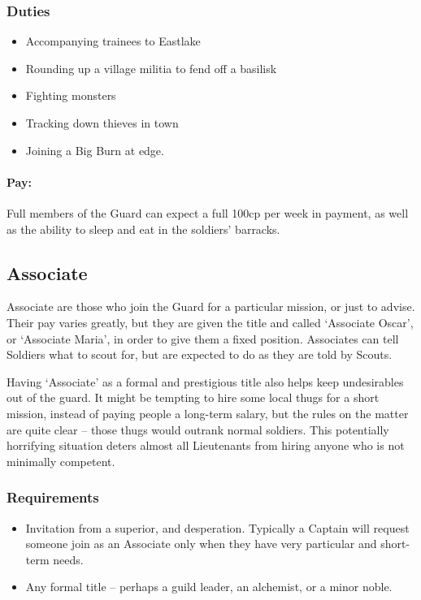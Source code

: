 \begin{multicols}{2}
\begin{itemize}
\end{itemize}

\subsubsection{Duties}

\begin{itemize}
  \item
  Accompanying trainees to Eastlake
  \item
  Rounding up a village militia to fend off a basilisk
  \item
  Fighting monsters
  \item
  Tracking down thieves in town
  \item
  Joining a Big Burn at \gls{edge}.
\end{itemize}

\paragraph{Pay:}
Full members of the Guard can expect a full 100cp per week in payment, as well as the ability to sleep and eat in the soldiers' barracks.

\subsection{Associate}

Associate are those who join the Guard for a particular mission, or just to advise.
Their pay varies greatly, but they are given the title and called `Associate Oscar', or `Associate Maria', in order to give them a fixed position.
Associates can tell Soldiers what to scout for, but are expected to do as they are told by Scouts.

Having `Associate' as a formal and prestigious title also helps keep undesirables out of the \gls{guard}.
It might be tempting to hire some local thugs for a short mission, instead of paying people a long-term salary, but the rules on the matter are quite clear -- those thugs would outrank normal soldiers.
This potentially horrifying situation deters almost all Lieutenants from hiring anyone who is not minimally competent.

\subsubsection{Requirements}

\begin{itemize}
  \item
  Invitation from a superior, and desperation.
  Typically a Captain will request someone join as an Associate only when they have very particular and short-term needs.
  \item
  Any formal title -- perhaps a guild leader, an alchemist, or a minor noble.
\end{itemize}


\end{multicols}
